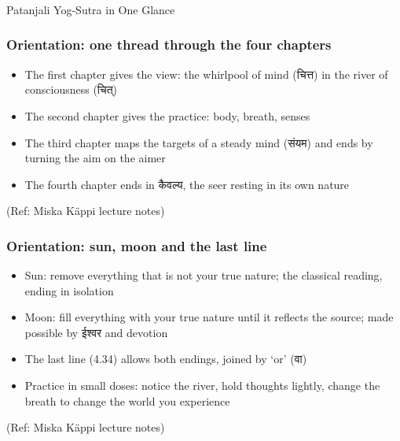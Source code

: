 \begin{frame}[fragile]\frametitle{}
\begin{center}
{\Large Patanjali Yog-Sutra in One Glance}
\end{center}
\end{frame}

\begin{frame}[fragile]\frametitle{Orientation: one thread through the four chapters}
\begin{itemize}
\item The first chapter gives the view: the whirlpool of mind (चित्त) in the river of consciousness (चित्)
\item The second chapter gives the practice: body, breath, senses
\item The third chapter maps the targets of a steady mind (संयम) and ends by turning the aim on the aimer
\item The fourth chapter ends in कैवल्य, the seer resting in its own nature
\end{itemize}
\tiny{(Ref: Miska Käppi lecture notes)}
\end{frame}

\begin{frame}[fragile]\frametitle{Orientation: sun, moon and the last line}
\begin{itemize}
\item Sun: remove everything that is not your true nature; the classical reading, ending in isolation
\item Moon: fill everything with your true nature until it reflects the source; made possible by ईश्वर and devotion
\item The last line (4.34) allows both endings, joined by `or' (वा)
\item Practice in small doses: notice the river, hold thoughts lightly, change the breath to change the world you experience
\end{itemize}
\tiny{(Ref: Miska Käppi lecture notes)}
\end{frame}

